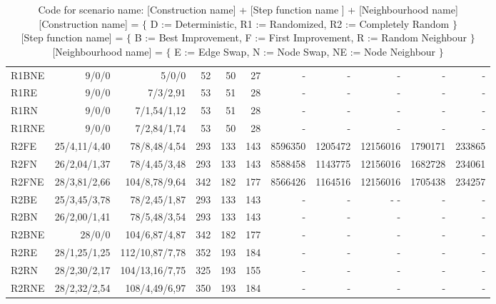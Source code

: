 \documentclass [11pt]{article}
\begin{document}
\begin{sidewaystable}
\begin{tabu} {| l |r | r |r |r |r |r |r |r |r |r |}
  R1BNE    &9/0/0   &5/0/0    &52    &50  & 27   &  -   &   -    &   -    &    -   &   -    \\ 
  R1RE    & 9/0/0  & 7/3/2,91   & 53   & 51 &  28  &  -   &   -    &   -    &    -   &   -    \\ 
  R1RN    & 9/0/0  & 7/1,54/1,12   & 53   & 51 &  28  &  -   &   -    &   -    &    -   &   -    \\ 
  R1RNE    &9/0/0   &7/2,84/1,74    &53    &50  & 28   &  -   &   -    &   -    &    -   &   -    \\ 
  R2FE    & 25/4,11/4,40  &  78/8,48/4,54   & 293   & 133  &  143  &  8596350  &  1205472   & 12156016    &  1790171  & 233865   \\ 
  R2FN    & 26/2,04/1,37  &  78/4,45/3,48   & 293   & 133  &  143  &  8588458  &  1143775   & 12156016    &  1682728  & 234061   \\ 
  R2FNE    &28/3,81/2,66   &104/8,78/9,64    &342    &182   & 177   & 8566426   & 1164516    & 12156016    & 1705438   &234257    \\ 
  R2BE    & 25/3,45/3,78  &  78/2,45/1,87   & 293   & 133  &  143  &  -   &   -    &   -  -    &    -   &   -    \\ 
  R2BN    & 26/2,00/1,41  &  78/5,48/3,54   & 293   & 133  &  143  &  -   &   -    &   -    &    -   &   -    \\ 
  R2BNE    &28/0/0   &104/6,87/4,87    &342    &182   & 177   &  -   &   -    &   -    &    -   &   -    \\ 
  R2RE    & 28/1,25/1,25  & 112/10,87/7,78   & 352   & 193  &  184  &  -   &   -    &   -    &    -   &   -    \\ 
  R2RN    & 28/2,30/2,17  & 104/13,16/7,75   & 325   & 193  &  155  &  -   &   -    &   -    &    -   &   -    \\ 
  R2RNE    &28/2,32/2,54   &108/4,49/6,97    &350    &193   & 184   &  -   &   -    &   -    &    -   &   -    \\
\end{tabu}
\caption{ Code for scenario name: [Construction name] + [Step function name ]  + [Neighbourhood name] \\ 
          {[Construction name]} = $\{$  D := Deterministic, R1 := Randomized, R2 := Completely Random $\}$  \\
          {[Step function name]} = $\{$  B := Best Improvement, F := First Improvement, R := Random Neighbour $\}$ \\
          {[Neighbourhood name]} = $\{$  E := Edge Swap, N := Node Swap, NE := Node Neighbour $\}$ } 
\end{sidewaystable}
\end{document}
